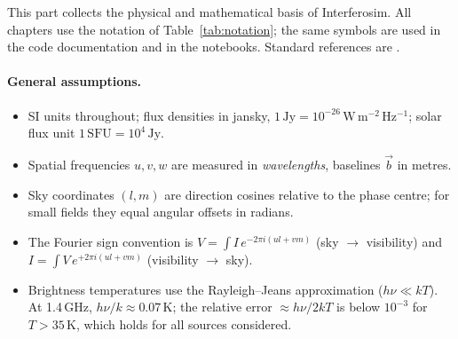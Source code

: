 
This part collects the physical and mathematical basis of
Interferosim. All chapters use the notation of
Table~\ref{tab:notation}; the same symbols are used in the code
documentation and in the notebooks. Standard references are
\cite{thompson2017,condon2016,wilson2013,taylor1999}.

\paragraph*{General assumptions.}
\begin{itemize}
  \item SI units throughout; flux densities in jansky,
        $1\,\mathrm{Jy} = 10^{-26}\,\mathrm{W\,m^{-2}\,Hz^{-1}}$;
        solar flux unit $1\,\mathrm{SFU} = 10^{4}\,\mathrm{Jy}$.
  \item Spatial frequencies $u,v,w$ are measured in \emph{wavelengths},
        baselines $\vec b$ in metres.
  \item Sky coordinates $(l,m)$ are direction cosines relative to the
        phase centre; for small fields they equal angular offsets in
        radians.
  \item The Fourier sign convention is $V = \int I\,e^{-2\pi i(ul+vm)}$
        (sky $\to$ visibility) and $I = \int V\,e^{+2\pi i(ul+vm)}$
        (visibility $\to$ sky).
  \item Brightness temperatures use the Rayleigh--Jeans approximation
        ($h\nu \ll kT$). At 1.4\,GHz, $h\nu/k \approx 0.07\,\mathrm{K}$;
        the relative error $\approx h\nu/2kT$ is below $10^{-3}$ for
        $T > 35\,\mathrm{K}$, which holds for all sources considered.
\end{itemize}

